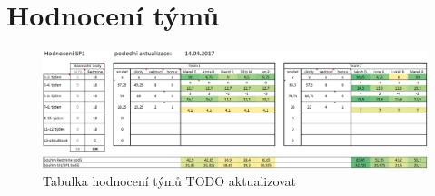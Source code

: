 \chapter{Hodnocení týmů} \label{ap:ranking}

\begin{figure}
\includegraphics[width=\textwidth]{../png/ranking.png}
\caption{Tabulka hodnocení týmů TODO aktualizovat} \label{picture:ranking}
\end{figure}
